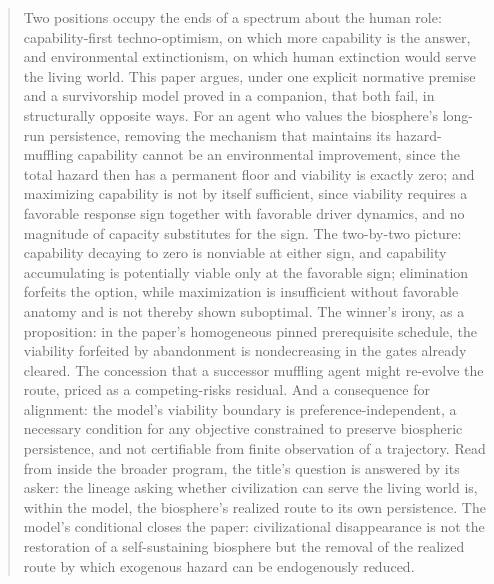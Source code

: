 \begin{abstract}
Two positions occupy the ends of a spectrum about the human role: capability-first techno-optimism, on which more capability is the answer, and environmental extinctionism, on which human extinction would serve the living world. This paper argues, under one explicit normative premise and a survivorship model proved in a companion, that both fail, in structurally opposite ways. For an agent who values the biosphere's long-run persistence, removing the mechanism that maintains its hazard-muffling capability cannot be an environmental improvement, since the total hazard then has a permanent floor and viability is exactly zero; and maximizing capability is not by itself sufficient, since viability requires a favorable response sign together with favorable driver dynamics, and no magnitude of capacity substitutes for the sign. The two-by-two picture: capability decaying to zero is nonviable at either sign, and capability accumulating is potentially viable only at the favorable sign; elimination forfeits the option, while maximization is insufficient without favorable anatomy and is not thereby shown suboptimal. The winner's irony, as a proposition: in the paper's homogeneous pinned prerequisite schedule, the viability forfeited by abandonment is nondecreasing in the gates already cleared. The concession that a successor muffling agent might re-evolve the route, priced as a competing-risks residual. And a consequence for alignment: the model's viability boundary is preference-independent, a necessary condition for any objective constrained to preserve biospheric persistence, and not certifiable from finite observation of a trajectory. Read from inside the broader program, the title's question is answered by its asker: the lineage asking whether civilization can serve the living world is, within the model, the biosphere's realized route to its own persistence. The model's conditional closes the paper: civilizational disappearance is not the restoration of a self-sustaining biosphere but the removal of the realized route by which exogenous hazard can be endogenously reduced.

\end{abstract}
